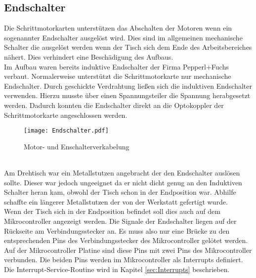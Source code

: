 \subsection{Endschalter}
Die Schrittmotorkarten unterstützen das Abschalten der Motoren wenn ein sogenannter Endschalter ausgelöst wird. Dies sind im allgemeinen mechanische Schalter die ausgelöst werden wenn der Tisch sich dem Ende des Arbeitsbereiches nähert. Dies verhindert eine Beschädigung des Aufbaus.\\
Im Aufbau waren bereits induktive Endschalter der Firma Pepperl+Fuchs verbaut. 
Normalerweise unterstützt die Schrittmotorkarte nur mechanische Endschalter. Durch geschickte Verdrahtung ließen sich die induktiven Endschalter verwenden. Hierzu musste über einen Spannungsteiler die Spannung herabgesetzt werden. Dadurch konnten die Endschalter direkt an die Optokoppler der Schrittmotorkarte angeschlossen werden. 
\begin{figure}[htb]
\centering
\texttt{[image: Endschalter.pdf]}
\caption{Motor- und Enschalterverkabelung}
\label{fig:Motorverkabelung}
\end{figure}\\
Am Drehtisch war ein Metallstutzen angebracht der den Endschalter auslösen sollte. Dieser war jedoch ungeeignet da er nicht dicht genug an den Induktiven Schalter heran kam, obwohl der Tisch schon in der Endposition war. Abhilfe schaffte ein längerer Metallstutzen der von der Werkstatt gefertigt wurde.\\
Wenn der Tisch sich in der Endposition befindet soll dies auch auf dem Mikrocontroller angezeigt werden. Die Signale der Endschalter liegen auf der Rückseite  am Verbindungsstecker an. Es muss also nur eine Brücke zu den entsprechenden Pins des Verbindungsstecker des Mikrocontroller gelötet werden.\\
Auf der Mikrocontroller Platine sind diese Pins mit zwei Pins des Mikrocontroller verbunden. Die beiden Pins werden im Mikrocontroller als Interrupts definiert. Die Interrupt-Service-Routine wird in Kapitel \ref{sec:Interrupts} beschrieben.

